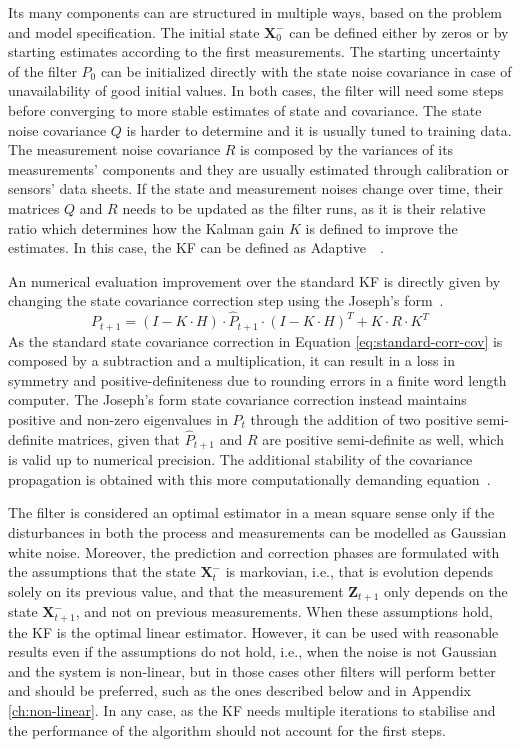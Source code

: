 Its many components can are structured in multiple ways, based on the problem and model specification.
The initial state $\mathbf{X}_{0}^-$ can be defined either by zeros or by starting estimates according to the first measurements.
The starting uncertainty of the filter $P_0$ can be initialized directly with the state noise covariance in case of unavailability of good initial values. In both cases, the filter will need some steps before converging to more stable estimates of state and covariance.
The state noise covariance $Q$ is harder to determine and it is usually tuned to training data.
The measurement noise covariance $R$ is composed by the variances of its measurements' components and they are usually estimated through calibration or sensors' data sheets.
If the state and measurement noises change over time, their matrices $Q$ and $R$ needs to be updated as the filter runs, as it is their relative ratio which determines how the Kalman gain $K$ is defined to improve the estimates. In this case, the \gls{KF} can be defined as Adaptive~\cite{adaptive}~\cite{1099422}.


An numerical evaluation improvement over the standard \gls{KF} is directly given by changing the state covariance correction step using the Joseph’s form~\cite{schmidt_analysis_2010}.%
\begin{equation}
    P_{t+1} = (I - K \cdot H) \cdot \hat{P}_{t+1} \cdot (I - K \cdot H)^T + K \cdot R \cdot K^T
    \label{eq:joseph}
\end{equation}
As the standard state covariance correction in Equation \eqref{eq:standard-corr-cov} is composed by a subtraction and a multiplication, it can result in a loss in symmetry and positive-definiteness due to rounding errors in a finite word length computer.
The Joseph’s form state covariance correction instead maintains positive and non-zero eigenvalues in $P_t$ through the addition of two positive semi-definite matrices, given that $\hat{P}_{t+1}$ and $R$ are positive semi-definite as well, which is valid up to numerical precision.
The additional stability of the covariance propagation is obtained with this more computationally demanding equation~\cite{BarShalom2001EstimationWA}.

The filter is considered an optimal estimator in a mean square sense only if the disturbances in both the process and measurements can be modelled as Gaussian white noise.
Moreover, the prediction and correction phases are formulated with the assumptions that the state $\mathbf{X}_t^-$ is markovian, i.e., that is evolution depends solely on its previous value, and that the measurement $\mathbf{Z}_{t+1}$ only depends on the state $\mathbf{X}_{t+1}^-$, and not on previous measurements.
When these assumptions hold, the \gls{KF} is the optimal linear estimator.
However, it can be used with reasonable results even if the assumptions do not hold, i.e., when the noise is not Gaussian and the system is non-linear, but in those cases other filters will perform better and should be preferred, such as the ones described below and in Appendix \ref{ch:non-linear}.
In any case, as the \gls{KF} needs multiple iterations to stabilise and the performance of the algorithm should not account for the first steps.

